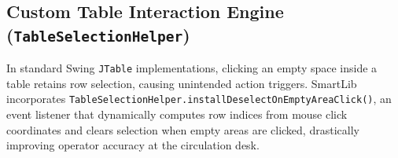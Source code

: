 \subsection{Custom Table Interaction Engine (\texttt{TableSelectionHelper})}
In standard Swing \texttt{JTable} implementations, clicking an empty space inside a table retains row selection, causing unintended action triggers. SmartLib incorporates \texttt{TableSelectionHelper.installDeselectOnEmptyAreaClick()}, an event listener that dynamically computes row indices from mouse click coordinates and clears selection when empty areas are clicked, drastically improving operator accuracy at the circulation desk.

